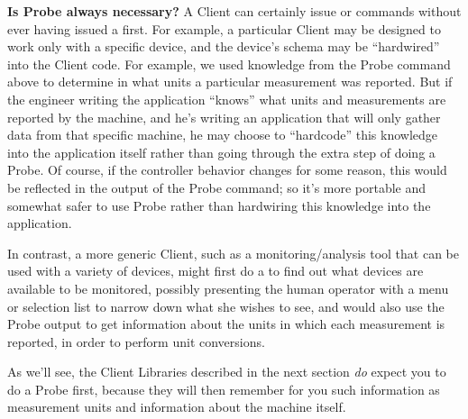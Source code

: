 \textbf{Is Probe always necessary?}
A Client can certainly issue  or  commands
without ever having issued a  first.  For example, a
particular Client may be designed to work only with a specific 
device, and the device's schema may be ``hardwired'' into the
Client code.  For example, we used knowledge from the
Probe command above to determine in what units a particular measurement
was reported.  But if the engineer writing the application ``knows''
what units and measurements are reported by the machine, and he's
writing an application that will only gather data from that specific
machine, he may choose to ``hardcode'' this knowledge into the
application itself rather than going through the extra step of doing a
Probe.  Of course, if the controller behavior changes for some reason,
this would be reflected in the output of the Probe command; so it's more
portable and somewhat safer to use Probe rather than hardwiring this
knowledge into the application.

In contrast, a more generic Client, such as a
monitoring/analysis tool that can be used with a variety of devices,
might first do a  to find out what devices are available
to be monitored, possibly presenting the human operator with a menu or
selection list to narrow down what she wishes to see, and would also use
the Probe output to get information about the units in which each
measurement is reported, in order to perform unit conversions.

As we'll see, the Client Libraries described in the next section
\emph{do} expect you to do a Probe first, because they will then
remember for you such information as measurement units and information
about the machine itself.


